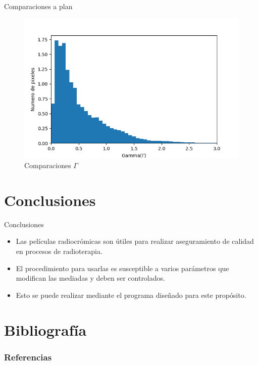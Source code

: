 \documentclass[12pt]{beamer}
\begin{document}
\begin{frame}{Comparaciones a plan}
\begin{figure}[htp]
\begin{minipage}{0.45\textwidth}
	\end{minipage}\hfill
	\begin{minipage}{0.45\textwidth}
		\includegraphics[width=\textwidth]{images/histogramaDosisMama.png}
	\end{minipage}
	\caption{Comparaciones $\Gamma$}
\end{figure}
\end{frame}

\section{Conclusiones}

\begin{frame}{Conclusiones}
	\begin{itemize}
		\item Las películas radiocrómicas son útiles para realizar aseguramiento de calidad en procesos de radioterapia.
		\item El procedimiento para usarlas es susceptible a varios parámetros que modifican las mediadas y deben ser controlados.
		\item Esto se puede realizar mediante el programa diseñado para este propósito.
	\end{itemize}
\end{frame}




\section{Bibliografía}
\begin{frame}[allowframebreaks]
\frametitle{Referencias}
\nocite{*}


\end{frame}
\end{document}
